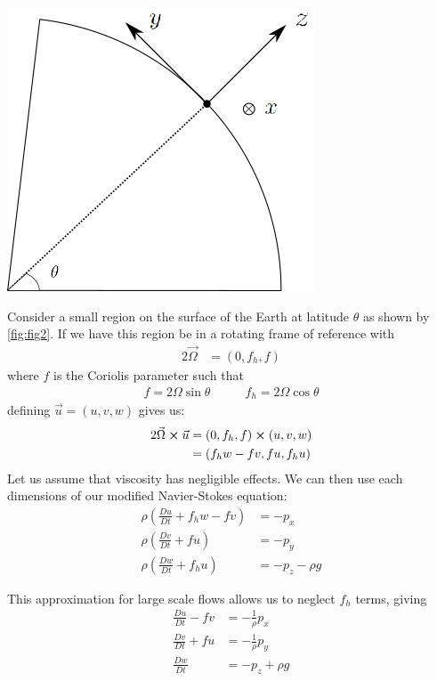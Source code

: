 \vspace{5mm}
\begin{minipage}{0.49\textwidth}
    \vspace{-2ex}
    \begin{center}
        \includegraphics[width=0.7\linewidth]{assets/figure-2.png}
        \label{fig:fig2}
    \end{center}
\end{minipage}\hspace{0.05\textwidth}
\begin{minipage}{0.49\textwidth}
    Consider a small region on the surface of the Earth at latitude $\theta$ as shown by \ref{fig:fig2}. If we have this region be in a rotating frame of reference with
    \begin{align*}
        2\vec{\Omega} &= \left(0,f_h,f\right)
    \end{align*}
    where $f$ is the Coriolis parameter such that
    \begin{align*}
        f = 2\Omega\sin\theta &\qquad f_h=2\Omega\cos\theta
    \end{align*}
    defining $\vec{u}=(u,v,w)$ gives us:
    \begin{align*}
        2\vec{\Omega}\cross\vec{u} &= (0,f_h,f)\cross(u,v,w)\\
        &= (f_h w-fv,fu,f_h u)
    \end{align*}
    Let us assume that viscosity has negligible effects. We can then use each dimensions of our modified Navier-Stokes equation:
    \begin{align*}
        \rho \left(\frac{Du}{Dt}+f_hw-fv\right)&=-p_x\\
        \rho \left(\frac{Dv}{Dt}+fu\right)&=-p_y\\
        \rho\left(\frac{Dw}{Dt}+f_hu\right)&= -p_z-\rho g
    \end{align*}
\end{minipage}
This approximation for large scale flows allows us to neglect $f_h$ terms, giving
\begin{align}
    \label{eqn:mom1}
    \frac{Du}{Dt}-fv &= -\frac{1}{\rho}p_x\\
    \label{eqn:mom2}
    \frac{Dv}{Dt}+fu &= -\frac{1}{\rho}p_y\\
    \frac{Dw}{Dt} &=-p_z+\rho g
\end{align}

